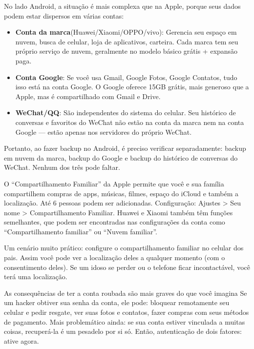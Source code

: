 
No lado Android, a situação é mais complexa que na Apple, porque seus dados podem estar dispersos em várias contas:

\begin{itemize}
  \item \textbf{Conta da marca}(Huawei/Xiaomi/OPPO/vivo): Gerencia seu espaço em nuvem, busca de celular, loja de aplicativos, carteira. Cada marca tem seu próprio serviço de nuvem, geralmente no modelo básico grátis + expansão paga.
  \item \textbf{Conta Google}: Se você usa Gmail, Google Fotos, Google Contatos, tudo isso está na conta Google. O Google oferece 15GB grátis, mais generoso que a Apple, mas é compartilhado com Gmail e Drive.
  \item \textbf{WeChat/QQ}: São independentes do sistema do celular. Seu histórico de conversas e favoritos do WeChat não estão na conta da marca nem na conta Google — estão apenas nos servidores do próprio WeChat.
\end{itemize}

Portanto, ao fazer backup no Android, é preciso verificar separadamente: backup em nuvem da marca, backup do Google e backup do histórico de conversas do WeChat. Nenhum dos três pode faltar.


O “Compartilhamento Familiar” da Apple permite que você e sua família compartilhem compras de apps, músicas, filmes, espaço do iCloud e também a localização. Até 6 pessoas podem ser adicionadas. Configuração: Ajustes > Seu nome > Compartilhamento Familiar. Huawei e Xiaomi também têm funções semelhantes, que podem ser encontradas nas configurações da conta como “Compartilhamento familiar” ou “Nuvem familiar”.

Um cenário muito prático: configure o compartilhamento familiar no celular dos pais. Assim você pode ver a localização deles a qualquer momento (com o consentimento deles). Se um idoso se perder ou o telefone ficar incontactável, você terá uma localização.

\begin{tcbwarn}{As consequências de ter a conta roubada são mais graves do que você imagina}
Se um hacker obtiver sua senha da conta, ele pode: bloquear remotamente seu celular e pedir resgate, ver suas fotos e contatos, fazer compras com seus métodos de pagamento. Mais problemático ainda: se sua conta estiver vinculada a muitas coisas, recuperá-la é um pesadelo por si só. Então, autenticação de dois fatores: ative agora.

\end{tcbwarn}

